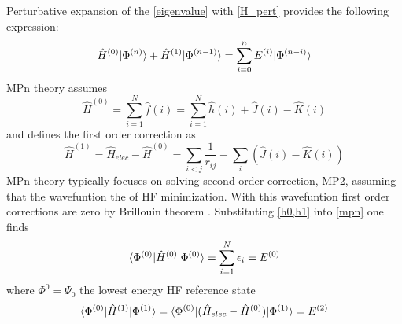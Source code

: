        Perturbative expansion of the \cref{eigenvalue} with \cref{H_pert} provides the following expression:
         \begin{equation}\label{mpn}
         	  \hat{H}^{(0)}| \Phi^{(n)} \rangle + \hat{H}^{(1)}| \Phi^{(n-1)} \rangle = \sum_{i=0}^n E^{(i)} | \Phi^{(n-i)} \rangle
        \end{equation}  
      MPn theory assumes %
        \begin{equation}\label{h0}
          \hat{H}^{(0)} = \sum_{i=1}^N \hat{f}(i) = \sum_{i=1}^N \hat{h}(i) + \hat{J}(i) - \hat{K}(i)
        \end{equation}
      and defines the first order correction as 
        \begin{equation}\label{h1}
          \hat{H}^{(1)} = \hat{H}_{elec} - \hat{H}^{(0)} = \sum_{i<j} \frac{1}{r_{ij}} - \sum_i (\hat{J}(i) - \hat{K}(i))
        \end{equation}
      MPn theory typically focuses on solving second order correction, MP2, assuming that the wavefuntion the of HF minimization.  With this wavefuntion first order corrections are zero by Brillouin theorem \cite{Surjan1989}. Substituting \cref{h0,h1} into \cref{mpn} one finds 
        \begin{equation}
          \langle\Phi^{(0)} |\hat{H}^{(0)}| \Phi^{(0)} \rangle = \sum_{i=1}^N \epsilon_i = E^{(0)}
        \end{equation}
        where $\Phi^{0} = \Psi_0$ the lowest energy HF reference state 
        \begin{equation} \label{E2}
           \langle\Phi^{(0)} |\hat{H}^{(1)}| \Phi^{(1)} \rangle =\langle\Phi^{(0)} |(\hat{H}_{elec} - \hat{H}^{(0)}) | \Phi^{(1)} \rangle  =  E^{(2)}
         \end{equation}
